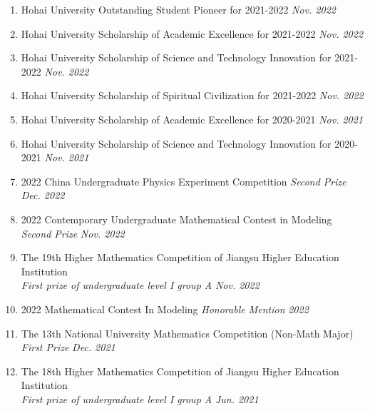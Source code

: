\documentclass[12pt]{article}
\begin{document}
\begin{enumerate}
    \item Hohai University Outstanding Student Pioneer for 2021-2022 \hfill \textit{Nov. 2022} %
    \item Hohai University Scholarship of Academic Excellence for 2021-2022 \hfill \textit{Nov. 2022} %
    \item Hohai University Scholarship of Science and Technology Innovation for 2021-2022 \hfill \textit{Nov. 2022} %
    \item Hohai University Scholarship of Spiritual Civilization for 2021-2022 \hfill \textit{Nov. 2022} %
    \item Hohai University Scholarship of Academic Excellence for 2020-2021 \hfill \textit{Nov. 2021} %
    \item Hohai University Scholarship of Science and Technology Innovation for 2020-2021 \hfill \textit{Nov. 2021} %
          \\
    \item 2022 China Undergraduate Physics Experiment Competition \textit{Second Prize}  \hfill \textit{Dec. 2022} %
    \item 2022 Contemporary Undergraduate Mathematical Contest in Modeling \textit {Second Prize} \hfill \textit{Nov. 2022} %
    \item The 19th Higher Mathematics Competition of Jiangsu Higher Education Institution \\ \textit{First prize of undergraduate level I group A} \hfill \textit{Nov. 2022} %
    \item 2022 Mathematical Contest In Modeling \textit{Honorable Mention} \hfill \textit{2022} %
    \item The 13th National University Mathematics Competition (Non-Math Major) \textit {First Prize} \hfill \textit{Dec. 2021} %
    \item The 18th Higher Mathematics Competition of Jiangsu Higher Education Institution \\ \textit{First prize of undergraduate level I group A} \hfill \textit{Jun. 2021} %
\end{enumerate}
\end{document}
